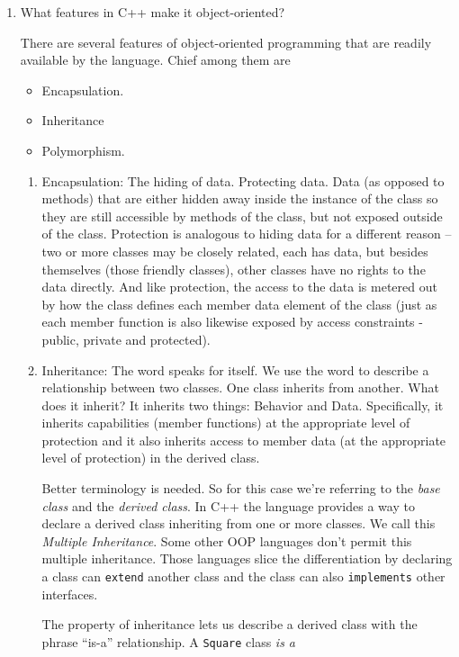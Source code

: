 \documentclass[12pt]{article}
\begin{document}
\begin{enumerate}
\item What features in C++ make it object-oriented?

There are several features of object-oriented programming that are
readily available by the language.  Chief among them are
\begin{itemize}
   \item Encapsulation.
   \item Inheritance
   \item Polymorphism.
\end{itemize}

\begin{enumerate}
   \item Encapsulation:   The hiding of data.  Protecting data.
Data (as opposed to methods) that are either hidden away inside the
instance of the class so they are still accessible by methods of the
class, but not exposed outside of the class.  Protection is analogous
to hiding data for a different reason -- two or more classes may
be closely related, each has data, but besides themselves (those friendly
classes), other classes have no rights to the data directly.  And
like protection, the access to the data is metered out by how the
class defines each member data element of the class (just as each
member function is also likewise exposed by access constraints - 
public, private and protected).
  \item Inheritance:  The word speaks for itself.  We use the word
to describe a relationship between two classes.  One class inherits
from another.  What does it inherit?  It inherits two things:  Behavior
and Data.  Specifically, it inherits capabilities (member functions)
at the appropriate level of protection and it also inherits access to
member data (at the appropriate level of protection) in the derived class.
\par
Better terminology is needed.  So for this case we're referring to
the {\textit{base class}} and the {\textit{derived class}}.  In C++
the language provides a way to declare a derived class inheriting from
one or more classes.  We call this {\textit{Multiple Inheritance}}.  Some
other OOP languages don't permit this multiple inheritance.  Those languages
slice the differentiation by declaring a class can {\texttt{extend}} another
class and the class can also {\texttt{implements}} other interfaces.
\par The property of inheritance lets us describe a derived class with the
phrase ``is-a'' relationship.   A {\texttt{Square}} class {\textit{is a}}

\end{enumerate}
\end{enumerate}
\end{document}
